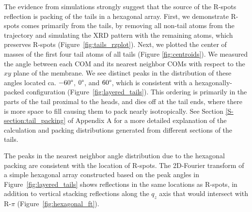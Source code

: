   The evidence from simulations strongly suggest that the source of the R-spots
  reflection is packing of the tails in a hexagonal array.  First, we demonstrate
  R-spots comes primarily from the tails, by removing all non-tail atoms from the
  trajectory and simulating the XRD pattern with the remaining atoms, which
  preserves R-spots (Figure~\ref{fig:tails_rzplot}).  Next, we plotted the center
  of masses of the first four tail atoms of all tails (Figure
  \ref{fig:centroids}). We measured the angle between each COM and its nearest
  neighbor COMs with respect to the $xy$ plane of the membrane. We see distinct
  peaks in the distribution of these angles located ca. $-60\degree$, $0\degree$,
  and $60\degree$, which is consistent with a hexagonally-packed configuration
  (Figure~\ref{fig:layered_tails}). This ordering is primarily in the parts of
  the tail proximal to the heads, and dies off at the tail ends, where there is
  more space to fill causing them to pack nearly isotropically. See Section
  \ref{S-section:tail_packing} of Appendix A for a more detailed explanation of the
  calculation and packing distributions generated from different sections of the
  tails.

  The peaks in the nearest neighbor angle distribution due to the hexagonal
  packing are consistent with the location of R-spots. The 2D-Fourier transform
  of a simple hexagonal array constructed based on the peak angles in
  Figure~\ref{fig:layered_tails} shows reflections in the same locations as
  R-spots, in addition to vertical stacking reflections along the $q_z$ axis that
  would intersect with R-$\pi$ (Figure~\ref{fig:hexagonal_ft}). 

